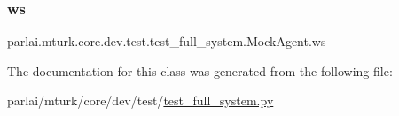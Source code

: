 \subsubsection{\texorpdfstring{ws}{ws}}
{\footnotesize\ttfamily parlai.\+mturk.\+core.\+dev.\+test.\+test\+\_\+full\+\_\+system.\+Mock\+Agent.\+ws}



The documentation for this class was generated from the following file\+:\begin{DoxyCompactItemize}
\item 
parlai/mturk/core/dev/test/\hyperlink{dev_2test_2test__full__system_8py}{test\+\_\+full\+\_\+system.\+py}\end{DoxyCompactItemize}
